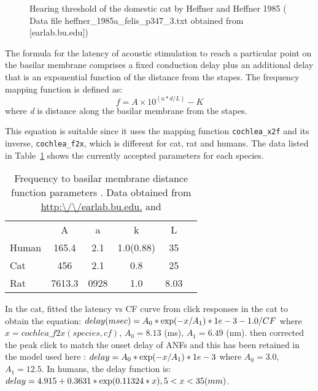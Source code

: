 \begin{appendix}
\medskip{}

\begin{figure}[htb]
\begin{center}
\caption{Hearing threshold of the domestic cat by Heffner and Heffner
  1985 \citep{HeffnerHeffner:1985} ( Data file
  heffner\_1985a\_felis\_p347\_3.txt obtained from [earlab.bu.edu])}
\label{fig:AudThresholdRat}
\end{center}
\end{figure}


The formula for the latency of acoustic stimulation to reach a
particular point on the basilar membrane comprises a fixed conduction
delay plus an additional delay that is an exponential function of the
distance from the stapes. The frequency mapping function is defined
as:
\[
 f = A\times10^{\left(a*d/L\right)} - K
 \]
where \emph{d} is distance along the basilar membrane from the stapes.

\medskip{}

This equation is suitable since it uses the mapping function
\texttt{cochlea\_x2f} and its inverse, \texttt{cochlea\_f2x}, which is
different for cat, rat and humans.  The data listed in
Table~\ref{tab:f2x} shows the currently accepted parameters for each
species.


\begin{table}[h]
  \centering
  \begin{tabular}{lccccc}
    \hline
& A & a & k & L \\
Human &165.4	&2.1	&1.0(0.88)	&35     \\
Cat&456&	2.1&0.8&25 \\
Rat&7613.3	&0928	&1.0&	8.03     \\
    \hline
  \end{tabular}
  \caption{Frequency to basilar membrane distance function parameters \citep{FitzGeraldBurkittEtAl:2001}. Data obtained from \url{http:\/\/earlab.bu.edu.} and }\label{tab:f2x}
\end{table}


In the cat, \citet{CarneyYin:1988} fitted the latency vs CF curve from
click responses in the cat to obtain the equation: \( delay (msec) =
A_0 * {\rm exp}( -x / A_1 ) * 1e-3 - 1.0/CF \) where $x = cochlea\_f2x(species, cf)$, $A_0 = 8.13$ (ms), $A_1 = 6.49$
(nm). \citet{HeinzZhangEtAl:2001} then corrected the peak click to
match the onset delay of ANFs and this has been retained in the model
used here \citep{ZilanyBruceEtAl:2009}: \(delay = A_0 * {\rm exp}(-x / A_1) * 1e-3
\) where $A_0 = 3.0$, $A_1 = 12.5$. In
humans, the delay function is: \( delay = 4.915 +
0.3631 * {\rm exp}(0.11324*x) , 5<x<35 (mm) \).


\end{appendix}
